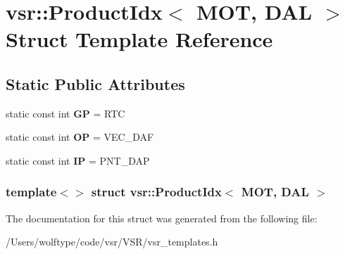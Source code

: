 \hypertarget{structvsr_1_1_product_idx_3_01_m_o_t_00_01_d_a_l_01_4}{\section{vsr\-:\-:Product\-Idx$<$ M\-O\-T, D\-A\-L $>$ Struct Template Reference}
\label{structvsr_1_1_product_idx_3_01_m_o_t_00_01_d_a_l_01_4}
}
\subsection*{Static Public Attributes}
\begin{DoxyCompactItemize}
\item 
\hypertarget{structvsr_1_1_product_idx_3_01_m_o_t_00_01_d_a_l_01_4_a552cd09796934c9d6f1d3db730d54dc8}{static const int {\bfseries G\-P} = R\-T\-C}\label{structvsr_1_1_product_idx_3_01_m_o_t_00_01_d_a_l_01_4_a552cd09796934c9d6f1d3db730d54dc8}

\item 
\hypertarget{structvsr_1_1_product_idx_3_01_m_o_t_00_01_d_a_l_01_4_a90277fb0bd4aa7bfa6ef504a0fa61412}{static const int {\bfseries O\-P} = V\-E\-C\-\_\-\-D\-A\-F}\label{structvsr_1_1_product_idx_3_01_m_o_t_00_01_d_a_l_01_4_a90277fb0bd4aa7bfa6ef504a0fa61412}

\item 
\hypertarget{structvsr_1_1_product_idx_3_01_m_o_t_00_01_d_a_l_01_4_a4f6a9311f7220aae67b0c72b1c112750}{static const int {\bfseries I\-P} = P\-N\-T\-\_\-\-D\-A\-P}\label{structvsr_1_1_product_idx_3_01_m_o_t_00_01_d_a_l_01_4_a4f6a9311f7220aae67b0c72b1c112750}

\end{DoxyCompactItemize}
\subsubsection*{template$<$$>$ struct vsr\-::\-Product\-Idx$<$ M\-O\-T, D\-A\-L $>$}



The documentation for this struct was generated from the following file\-:\begin{DoxyCompactItemize}
\item 
/\-Users/wolftype/code/vsr/\-V\-S\-R/vsr\-\_\-templates.\-h\end{DoxyCompactItemize}

